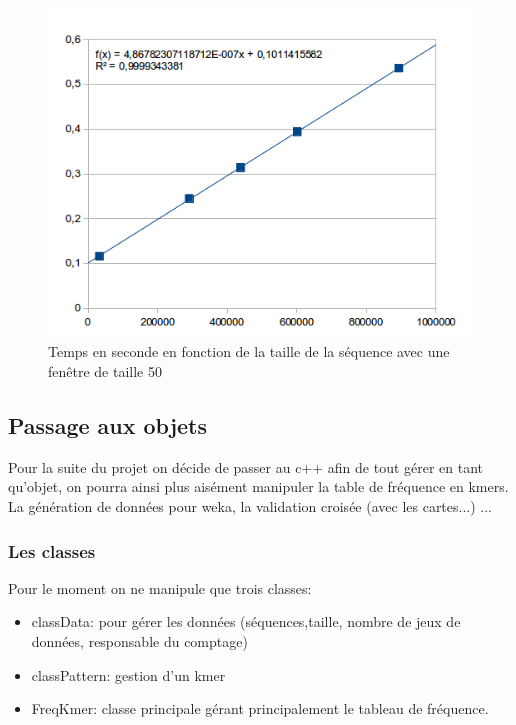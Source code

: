 \begin{figure}[H]
\begin{center}
\includegraphics[scale=0.6]{./../img/graphe_taille.png}
\caption[Temps de du comptage]{\label{taille_cpt}Temps en seconde en fonction de la taille de la séquence avec une fenêtre de taille 50}
\end{center}
\end{figure}
  
\subsection{Passage aux objets}
Pour la suite du projet on décide de passer au c++ afin de tout gérer en tant qu'objet, on pourra ainsi plus aisément manipuler la table de fréquence en kmers. La génération
de données pour weka, la validation croisée (avec les cartes...) ...
\subsubsection{Les classes}
Pour le moment on ne manipule que trois classes:
\begin{itemize}
 \item classData: pour gérer les données (séquences,taille, nombre de jeux de données, responsable du comptage)
  \item classPattern: gestion d'un kmer
  \item FreqKmer: classe principale gérant principalement le tableau de fréquence.
\end{itemize}
~\\


